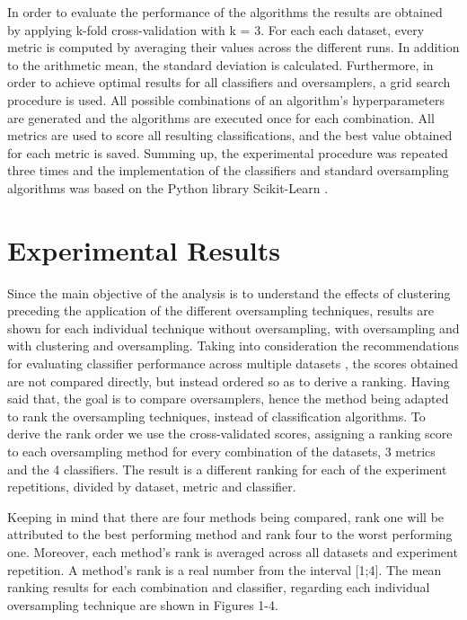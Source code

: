 \documentclass[parskip=full]{scrartcl}
\begin{document}
In order to evaluate the performance of the algorithms the results are obtained 
by applying k-fold cross-validation with k = 3. For each each dataset, every 
metric is computed by averaging their values across the different runs. In 
addition to the arithmetic mean, the standard deviation is calculated. 
Furthermore, in order to achieve optimal results for all classifiers and 
oversamplers, a grid search procedure is used. All possible combinations of an 
algorithm’s hyperparameters are generated and the algorithms are executed once 
for each combination. All metrics are used to score all resulting 
classifications, and the best value obtained for each metric is saved. Summing 
up, the experimental procedure was repeated three times and the implementation 
of the classifiers and standard oversampling algorithms was based on the Python 
library Scikit-Learn \cite{Pedregosa2011}. 

\section{Experimental Results}

Since the main objective of the analysis is to understand the effects of 
clustering preceding the application of the different oversampling techniques, 
results are shown for each individual technique without oversampling, with 
oversampling and with clustering and oversampling. Taking into consideration 
the recommendations for evaluating classifier performance across multiple 
datasets \cite{Demsar2006}, the scores obtained are not compared directly, but 
instead ordered so as to derive a ranking. Having said that, the goal is to 
compare oversamplers, hence the method being adapted to rank the oversampling 
techniques, instead of classification algorithms. To derive the rank order we 
use the cross-validated scores, assigning a ranking score to each oversampling 
method for every combination of the datasets, 3 metrics and the 4 classifiers. 
The result is a different ranking for each of the experiment repetitions, 
divided by dataset, metric and classifier. 

Keeping in mind that there are four methods being compared, rank one will be 
attributed to the best performing method and rank four to the worst performing 
one. Moreover, each method's rank is averaged across all datasets and 
experiment repetition. A method's rank is a real number from the interval 
[1;4]. The mean ranking results for each combination and classifier, regarding 
each individual oversampling technique are shown in Figures 1-4.
\end{document}

